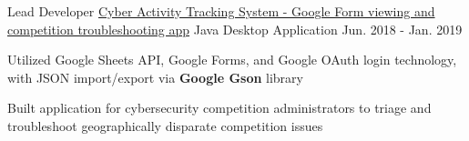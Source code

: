 \begin{cventries}
  \cventry
    {Lead Developer} %
    {\href{https://github.com/hexalellogram/FlyerScanner}{Cyber Activity Tracking System - Google Form viewing and competition troubleshooting app}} %
    {Java Desktop Application} %
    {Jun. 2018 - Jan. 2019} %
    {
      \begin{cvitems} %
        \item {Utilized Google Sheets API, Google Forms, and Google OAuth login technology, with JSON import/export via \textbf{Google Gson} library}
        \item {Built application for cybersecurity competition administrators to triage and troubleshoot geographically disparate competition issues}
      \end{cvitems}
    }
    
\end{cventries}